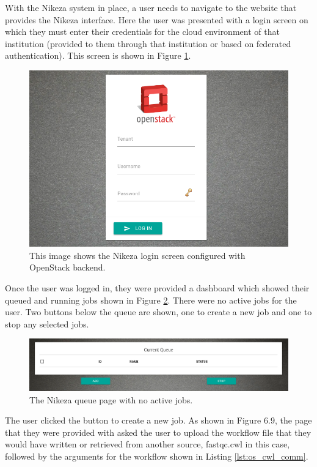With the Nikeza system in place, a user needs to navigate to the website that provides the Nikeza interface. Here the user was presented with a login screen on which they must enter their credentials for the cloud environment of that institution (provided to them through that institution or based on federated authentication). This screen is shown in Figure \ref{fig:os_login}.

\begin{figure}[h!]
\centering
\includegraphics[width=\textwidth]{Figures/4_os_login.png}
\decoRule
\caption[Nikeza Login Screen]{This image shows the Nikeza login screen configured with OpenStack backend.}
\label{fig:os_login}
\end{figure}

Once the user was logged in, they were provided a dashboard which showed their queued and running jobs shown in Figure \ref{fig:os_queue}. There were no active jobs for the user. Two buttons below the queue are shown, one to create a new job and one to stop any selected jobs.

\begin{figure}[h!]
\centering
\includegraphics[width=\textwidth]{Figures/4_os_queue.png}
\decoRule
\caption[Nikeza Job Queue Page]{The Nikeza queue page with no active jobs.}
\label{fig:os_queue}
\end{figure}

The user clicked the button to create a new job. As shown in Figure 6.9, the page that they were provided with asked the user to upload the workflow file that they would have written or retrieved from another source, fastqc.cwl in this case, followed by the arguments for the workflow shown in Listing \ref{lst:os_cwl_comm}.

